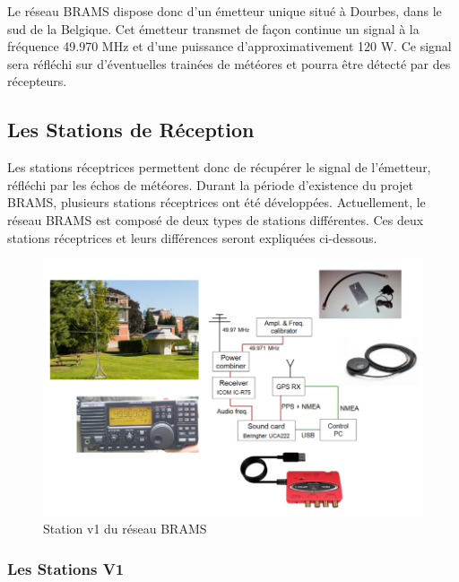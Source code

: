\documentclass[11pt]{article}
\begin{document}
Le réseau BRAMS dispose donc d'un émetteur unique situé à Dourbes, dans le sud de la Belgique.
Cet émetteur transmet de façon continue un signal à la fréquence 49.970 MHz et d'une puissance d'approximativement 120 W.
Ce signal sera réfléchi sur d'éventuelles trainées de météores et pourra être détecté par des récepteurs.

\subsection{Les Stations de Réception}
Les stations réceptrices permettent donc de récupérer le signal de l'émetteur, réfléchi par les échos de météores.
Durant la période d'existence du projet BRAMS, plusieurs stations réceptrices ont été développées.
Actuellement, le réseau BRAMS est composé de deux types de stations différentes.
Ces deux stations réceptrices et leurs différences seront expliquées ci-dessous.

\begin{figure}[h]
    \begin{center}
        \includegraphics[scale=0.6]{Material_BRAMS_1.0.png}
        \caption{Station v1 du réseau BRAMS}
        \label{fig:station_icom}
    \end{center}
\end{figure}

\subsubsection{Les Stations V1}
\end{document}
